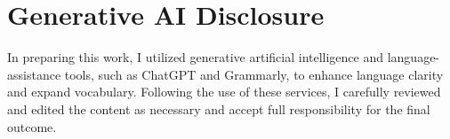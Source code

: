 \section*{Generative AI Disclosure}
In preparing this work, I utilized generative artificial intelligence and language-assistance tools, such as ChatGPT and Grammarly, to enhance language clarity and expand vocabulary. Following the use of these services, I carefully reviewed and edited the content as necessary and accept full responsibility for the final outcome.
